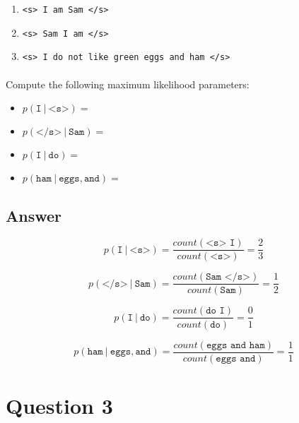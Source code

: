\documentclass{article}
\newcommand\given[1][]{\:#1\vert\:}
\begin{document}
\begin{enumerate}
    \item \texttt{<s> I am Sam </s>}
    \item \texttt{<s> Sam I am </s>}
    \item \texttt{<s> I do not like green eggs and ham </s>}
\end{enumerate}

\paragraph{} Compute the following maximum likelihood parameters:

\begin{itemize}
    \item $p(\texttt{I} \given \texttt{<s>})=$
    \item $p(\texttt{</s>} \given \texttt{Sam})=$
    \item $p(\texttt{I} \given \texttt{do})=$
    \item $p(\texttt{ham} \given \texttt{eggs},\texttt{and})=$
\end{itemize}

\subsection*{Answer}

\begin{equation}
    p(\texttt{I} \given \texttt{<s>}) = \frac{count(\texttt{<s> I})}{count(\texttt{<s>})} = \frac{2}{3}
\end{equation}

\begin{equation}
    p(\texttt{</s>} \given \texttt{Sam}) = \frac{count(\texttt{Sam </s>})}{count(\texttt{Sam})} = \frac{1}{2}
\end{equation}

\begin{equation}
    p(\texttt{I} \given \texttt{do}) = \frac{count(\texttt{do I})}{count(\texttt{do})} = \frac{0}{1}
\end{equation}

\begin{equation}
    p(\texttt{ham} \given \texttt{eggs},\texttt{and}) = \frac{count(\texttt{eggs and ham})}{count(\texttt{eggs and})} = \frac{1}{1}
\end{equation}

\clearpage

\section*{Question 3}
\end{document}
